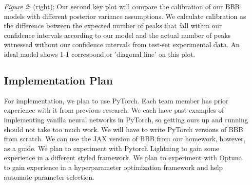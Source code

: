 \documentclass{article}
\begin{document}
\textit{Figure 2}: (right): Our second key plot will compare the calibration of our BBB models with different posterior variance assumptions. We calculate calibration as the difference between the expected number of peaks that fall within our confidence intervals according to our model and the actual number of peaks witnessed without our confidence intervals from test-set experimental data. An ideal model shows 1-1 correspond or 'diagonal line' on this plot. 
\subsection{Implementation Plan}
For implementation, we plan to use PyTorch. Each team member has prior experience with it from previous research. We each have past examples of implementing vanilla neural networks in PyTorch, so getting ours up and running should not take too much work. We will have to write PyTorch versions of BBB from scratch. We can use the JAX version of BBB from our homework, however, as a guide. We plan to experiment with Pytorch Lightning to gain some experience in a different styled framework. We plan to experiment with Optuna to gain experience in a hyperparameter optimization framework and help automate parameter selection.
\end{document}

